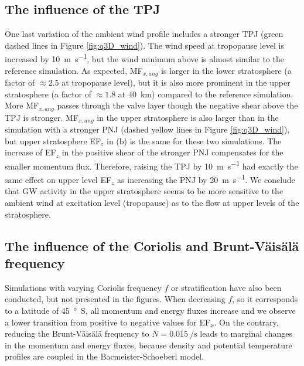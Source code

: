\subsection*{The influence of the TPJ}
One last variation of the ambient wind profile includes a stronger TPJ (green dashed lines in Figure \ref{fig:q3D_wind}). The wind speed at tropopause level is increased by \SI{10}{\meter\per\second}, but the wind minimum above is almost similar to the reference simulation. As expected, MF$_{x,ang}$ is larger in the lower stratosphere (a factor of $\approx 2.5$ at tropopause level), but it is also more prominent in the upper stratosphere (a factor of $\approx 1.8$ at \SI{40}{\kilo\meter}) compared to the reference simulation. More MF$_{x,ang}$ passes through the valve layer though the negative shear above the TPJ is stronger. MF$_{x,ang}$ in the upper stratosphere is also larger than in the simulation with a stronger PNJ (dashed yellow lines in Figure \ref{fig:q3D_wind}), but upper stratosphere EF$_z$ in (b) is the same for these two simulations. The increase of EF$_z$ in the positive shear of the stronger PNJ compensates for the smaller momentum flux. Therefore, raising the TPJ by \SI{10}{\meter\per\second} had exactly the same effect on upper level EF$_z$ as increasing the PNJ by \SI{20}{\meter\per\second}. We conclude that GW activity in the upper stratosphere seems to be more sensitive to the ambient wind at excitation level (tropopause) as to the flow at upper levels of the stratosphere.

\subsection*{The influence of the Coriolis and Brunt-Väisälä frequency}
Simulations with varying Coriolis frequency $f$ or stratification have also been conducted, but not presented in the figures. When decreasing $f$, so it corresponds to a latitude of \SI{45}{\degree S}, all momentum and energy fluxes increase and we observe a lower transition from positive to negative values for EF$_x$. On the contrary, reducing the Brunt-Väisälä frequency to $N=\SI{0.015}{\per\second}$ leads to marginal changes in the momentum and energy fluxes, because density and potential temperature profiles are coupled in the Bacmeister-Schoeberl model.


